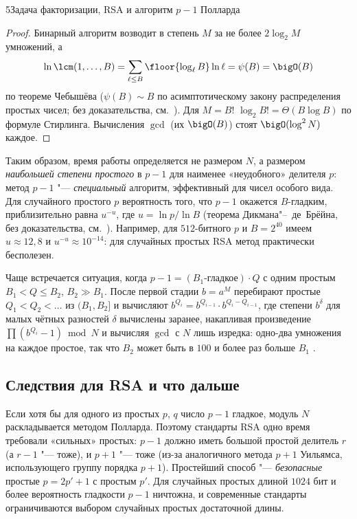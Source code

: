 \begin{lecture}{5}{Задача факторизации, RSA и алгоритм \texorpdfstring{$p - 1$}{p - 1} Полларда}
\begin{proof}
Бинарный алгоритм возводит в степень $M$ за не более $2\log_2 M$ умножений, а
\[
  \ln \lcm(1, \dots, B) = \sum_{\ell \le B} \floor{\log_\ell B} \ln \ell = \psi(B) = \bigO(B)
\]
по теореме Чебышёва ($\psi(B) \sim B$ по асимптотическому закону распределения простых чисел;
без доказательства, см.~\cite[гл.~1]{crandall-pomerance}). Для $M = B!$
$\log_2 B! = \Theta(B \log B)$ по формуле Стирлинга. Вычисления $\gcd$ (их
$\bigO(B)$) стоят $\bigO(\log^2 N)$ каждое.
\end{proof}

Таким образом, время работы определяется не размером $N$, а размером \emph{наибольшей
степени простого} в $p - 1$ для наименее «неудобного» делителя $p$: метод $p - 1$ "---
\emph{специальный} алгоритм, эффективный для чисел особого вида. Для случайного простого $p$
вероятность того, что $p - 1$ окажется $B$-гладким, приблизительно равна $u^{-u}$, где
$u = \ln p / \ln B$ (теорема Дикмана"--~де~Брёйна, без доказательства,
см.~\cite[гл.~1]{crandall-pomerance}). Например, для $512$-битного $p$ и $B = 2^{40}$
имеем $u \approx 12{,}8$ и $u^{-u} \approx 10^{-14}$: для случайных простых RSA метод
практически бесполезен.

\begin{remark}
Чаще встречается ситуация, когда $p - 1 = (\text{$B_1$-гладкое}) \cdot Q$ с одним простым
$B_1 < Q \le B_2$, $B_2 \gg B_1$. После первой стадии $b = a^M$ перебирают простые
$Q_1 < Q_2 < \dots$ из $(B_1, B_2]$ и вычисляют $b^{Q_{i}} = b^{Q_{i-1}} \cdot b^{Q_i - Q_{i-1}}$,
где степени $b^{\delta}$ для малых чётных разностей $\delta$ вычислены заранее, накапливая
произведение $\prod (b^{Q_i} - 1) \bmod N$ и вычисляя $\gcd$ с $N$ лишь изредка: одно-два
умножения на каждое простое, так что $B_2$ может быть в $100$ и более раз больше $B_1$
\cite[разд.~5.4]{crandall-pomerance}.
\end{remark}

\subsection{Следствия для RSA и что дальше}

Если хотя бы для одного из простых $p$, $q$ число $p - 1$ гладкое, модуль $N$ раскладывается
методом Полларда. Поэтому стандарты RSA одно время требовали «сильных» простых: $p - 1$
должно иметь большой простой делитель $r$ (а $r - 1$ "--- тоже), и $p + 1$ "--- тоже (из-за
аналогичного метода $p + 1$ Уильямса, использующего группу порядка $p + 1$). Простейший
способ "--- \emph{безопасные} простые $p = 2p' + 1$ с простым $p'$. Для случайных простых
длиной $1024$ бит и более вероятность гладкости $p - 1$ ничтожна, и современные стандарты
ограничиваются выбором случайных простых достаточной длины.


\end{lecture}
